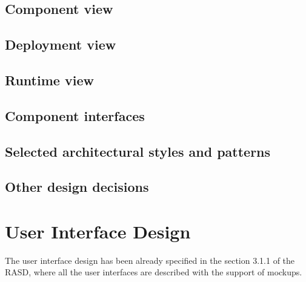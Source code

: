 \documentclass[18pt,oneside,a4paper, titlepage]{article}
\begin{document}
		\subsection{Component view}
		
		\subsection{Deployment view}
		\subsection{Runtime view}
		\subsection{Component interfaces}
		\subsection{Selected architectural styles and patterns}
			
		\subsection{Other design decisions}
		
	
\newpage	
	\section{User Interface Design}
		The user interface design has been already specified in the section 3.1.1 of the RASD, where all the user interfaces are described with the support of mockups.
		
\end{document}

